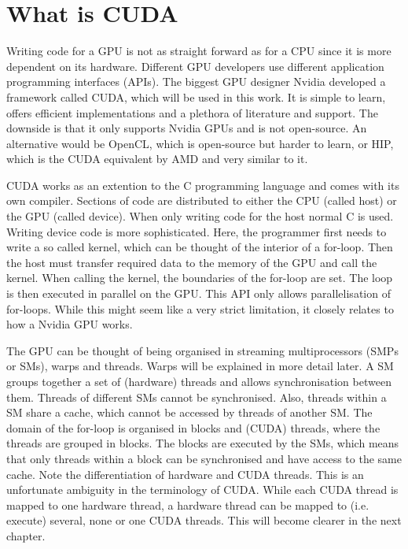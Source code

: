 \section{What is CUDA}
Writing code for a GPU is not as straight forward as for a CPU since it is more dependent on its hardware.
Different GPU developers use different application programming interfaces (APIs).
The biggest GPU designer Nvidia developed a framework called CUDA, which will be used in this work.
It is simple to learn, offers efficient implementations and a plethora of literature and support.
The downside is that it only supports Nvidia GPUs and is not open-source.
An alternative would be OpenCL, which is open-source but harder to learn, or HIP, which is the CUDA equivalent by AMD and very similar to it.

CUDA works as an extention to the C programming language and comes with its own compiler.
Sections of code are distributed to either the CPU (called host) or the GPU (called device).
When only writing code for the host normal C is used.
Writing device code is more sophisticated.
Here, the programmer first needs to write a so called kernel, which can be thought of the interior of a for-loop.
Then the host must transfer required data to the memory of the GPU and call the kernel.
When calling the kernel, the boundaries of the for-loop are set.
The loop is then executed in parallel on the GPU.
This API only allows parallelisation of for-loops.
While this might seem like a very strict limitation, it closely relates to how a Nvidia GPU works.

The GPU can be thought of being organised in streaming multiprocessors (SMPs or SMs), warps and threads.
Warps will be explained in more detail later.
A SM groups together a set of (hardware) threads and allows synchronisation between them.
Threads of different SMs cannot be synchronised.
Also, threads within a SM share a cache, which cannot be accessed by threads of another SM.
The domain of the for-loop is organised in blocks and (CUDA) threads, where the threads are grouped in blocks.
The blocks are executed by the SMs, which means that only threads within a block can be synchronised and have access to the same cache.
Note the differentiation of hardware and CUDA threads.
This is an unfortunate ambiguity in the terminology of CUDA.
While each CUDA thread is mapped to one hardware thread, a hardware thread can be mapped to (i.e. execute) several, none or one CUDA threads.
This will become clearer in the next chapter.
